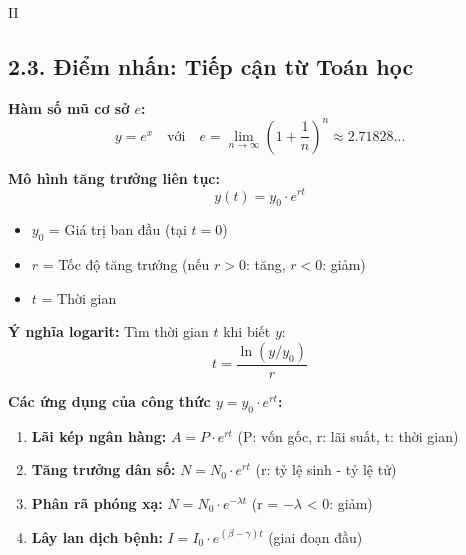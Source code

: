 \documentclass[12pt,a4paper]{article}
\begin{document}
\begin{competitionsection}{II}
\subsection*{2.3. Điểm nhấn: Tiếp cận từ Toán học}
\begin{mathbox}
\textbf{Hàm số mũ cơ sở $e$:}
$$y = e^x \quad \text{với} \quad e = \lim_{n \to \infty}\left(1 + \frac{1}{n}\right)^n \approx 2.71828...$$

\textbf{Mô hình tăng trưởng liên tục:}
$$y(t) = y_0 \cdot e^{rt}$$
\begin{itemize}[leftmargin=*,noitemsep]
\item $y_0$ = Giá trị ban đầu (tại $t=0$)
\item $r$ = Tốc độ tăng trưởng (nếu $r > 0$: tăng, $r < 0$: giảm)
\item $t$ = Thời gian
\end{itemize}

\textbf{Ý nghĩa logarit:} Tìm thời gian $t$ khi biết $y$:
$$t = \frac{\ln(y/y_0)}{r}$$
\end{mathbox}

\begin{realworld}
\textbf{Các ứng dụng của công thức $y = y_0 \cdot e^{rt}$:}
\begin{enumerate}[leftmargin=*,noitemsep]
\item \textbf{Lãi kép ngân hàng:} $A = P \cdot e^{rt}$ (P: vốn gốc, r: lãi suất, t: thời gian)
\item \textbf{Tăng trưởng dân số:} $N = N_0 \cdot e^{rt}$ (r: tỷ lệ sinh - tỷ lệ tử)
\item \textbf{Phân rã phóng xạ:} $N = N_0 \cdot e^{-\lambda t}$ (r = $-\lambda$ < 0: giảm)
\item \textbf{Lây lan dịch bệnh:} $I = I_0 \cdot e^{(\beta - \gamma)t}$ (giai đoạn đầu)
\end{enumerate}
\end{realworld}
\end{competitionsection}
\end{document}
